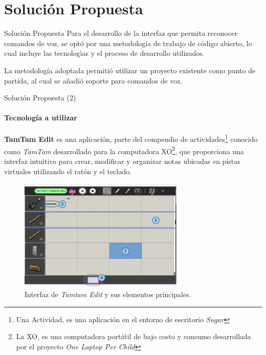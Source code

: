 \section{Soluci\'on Propuesta}

\begin{frame}{Soluci\'on Propuesta}
Para el desarrollo de la interfaz que permita reconocer comandos de voz, se opt\'o por una metodolog\'ia
de trabajo de c\'odigo abierto, lo cual incluye las tecnolog{\'\i}as y el proceso de desarrollo 
utilizados.

La metodolog\'ia adoptada permiti\'o utilizar un proyecto
existente como punto de partida, al cual se a\~nadi\'o soporte para comandos de voz. 
\end{frame}

\begin{frame}{Soluci\'on Propuesta (2)}
\framesubtitle{Tecnolog\'ia a utilizar}

\textbf{TamTam Edit}
es una aplicaci\'on, parte del compendio de 
actividades\footnote{Una Actividad, es una aplicaci\'on en el entorno 
de escritorio \emph{Sugar}} conocido como \emph{TamTam} desarrollado para la computadora 
XO\footnote{La XO, es una computadora port\'atil de bajo costo y consumo desarrollada por el proyecto
\emph{One Laptop Per Child}}, que proporciona una interfaz intuitiva para crear, modificar y organizar 
notas ubicadas en pistas virtuales utilizando el ratón y el teclado.

\begin{figure}[H]
\centering
\includegraphics[width=0.7\textwidth]{./graphics/ui-tamtam-edit.png}
\caption{Interfaz de \emph{Tamtam Edit} y sus elementos principales.}
\label{figure:ui-tamtam}
\end{figure}
\end{frame}


